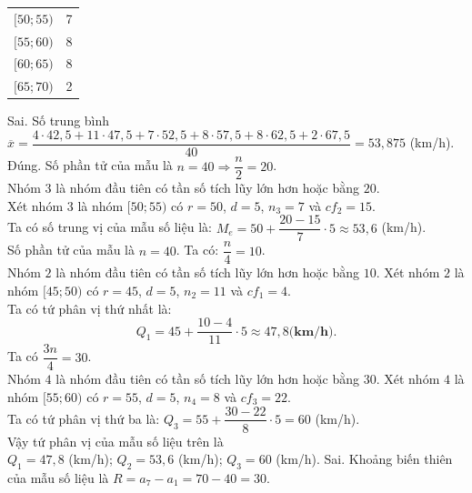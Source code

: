 \begin{ex}
{\begin{itemchoice}
\begin{center}
\begin{tabular}{|c|c|}
									{$[50;55)$} & 7 \\
									{$[55;60)$} & 8 \\
									{$[60;65)$} & 8 \\
									{$[65;70)$} & 2 \\
									\hline
								\end{tabular}
						\end{center}
			\itemch Sai. Số trung bình\\
					$\overline{x}=\dfrac{4\cdot 42{,}5+11\cdot 47{,}5+7\cdot 52{,}5+8\cdot 57{,}5+8\cdot 62{,}5+2\cdot 67{,}5}{40}=53{,}875$ (km/h).
		    \itemch Đúng. Số phần tử của mẫu là $n=40\Rightarrow \dfrac{n}{2}=20$.\\
					Nhóm $3$ là nhóm đầu tiên có tần số tích lũy lớn hơn hoặc bằng $20$.\\
					Xét nhóm $3$ là nhóm $[50;55)$ có $r=50$, $d=5$, $n_3=7$ và $cf_2=15$.\\
					Ta có số trung vị của mẫu số liệu là:
					$M_e=50+\dfrac{20-15}{7}\cdot 5\approx 53{,}6$ (km/h).\\
					Số phần tử của mẫu là $n=40$. Ta có: $\dfrac{n}{4}=10$.\\
					Nhóm $2$ là nhóm đầu tiên có tần số tích lũy lớn hơn hoặc bằng $10$.
					Xét nhóm $2$ là nhóm $[45;50)$ có $r=45$, $d=5$, $n_2=11$ và $cf_1=4$.\\
					Ta có tứ phân vị thứ nhất là:
					$$
					Q_1=45+\dfrac{10-4}{11} \cdot 5 \approx 47{,}8 \textbf{(km/h)}.
					$$
					Ta có $\dfrac{3n}{4}=30$.\\
					Nhóm $4$ là nhóm đầu tiên có tần số tích lũy lớn hơn hoặc bằng $30$.
					Xét nhóm $4$ là nhóm $[55;60)$ có $r=55$, $d=5$, $n_4=8$ và $cf_3=22$.\\
					Ta có tứ phân vị thứ ba là:
					$Q_3=55+\dfrac{30-22}{8}\cdot 5=60$ (km/h).\\
					Vậy tứ phân vị của mẫu số liệu trên là \\$Q_1=47{,}8$ (km/h); $Q_2=53{,}6$ (km/h); $Q_3=60$ (km/h).
		\itemch Sai. Khoảng biến thiên của mẫu số liệu là $R=a_7-a_1=70-40=30$. 
	\end{itemchoice}
		}		
\end{ex}

